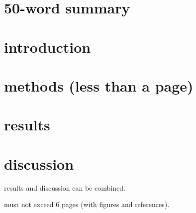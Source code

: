 \documentclass[12pt, a4paper]{article}
\begin{document}
\section{50-word summary}
\section{introduction}
\section{methods (less than a page)}
\section{results}
\section{discussion}

results and discussion can be combined.

must not exceed 6 pages (with figures and references).

\citep{Hanahan2011}



\end{document}
